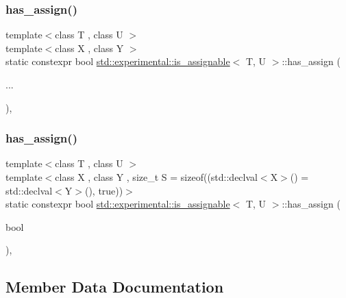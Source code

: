 \subsubsection{\texorpdfstring{has\+\_\+assign()}{has\_assign()}\hspace{0.1cm}{\footnotesize\ttfamily [1/2]}}
{\footnotesize\ttfamily template$<$class T , class U $>$ \\
template$<$class X , class Y $>$ \\
static constexpr bool \mbox{\hyperlink{structstd_1_1experimental_1_1is__assignable}{std\+::experimental\+::is\+\_\+assignable}}$<$ T, U $>$\+::has\+\_\+assign (\begin{DoxyParamCaption}\item[{}]{... }\end{DoxyParamCaption})\hspace{0.3cm}{\ttfamily [inline]}, {\ttfamily [static]}}

\mbox{\label{structstd_1_1experimental_1_1is__assignable_a826902a90f85d2a25cbab409ebe1aff6}} 
\subsubsection{\texorpdfstring{has\+\_\+assign()}{has\_assign()}\hspace{0.1cm}{\footnotesize\ttfamily [2/2]}}
{\footnotesize\ttfamily template$<$class T , class U $>$ \\
template$<$class X , class Y , size\+\_\+t S = sizeof((std\+::declval$<$\+X$>$() = std\+::declval$<$\+Y$>$(), true))$>$ \\
static constexpr bool \mbox{\hyperlink{structstd_1_1experimental_1_1is__assignable}{std\+::experimental\+::is\+\_\+assignable}}$<$ T, U $>$\+::has\+\_\+assign (\begin{DoxyParamCaption}\item[{bool}]{ }\end{DoxyParamCaption})\hspace{0.3cm}{\ttfamily [inline]}, {\ttfamily [static]}}



\subsection{Member Data Documentation}
\mbox{\label{structstd_1_1experimental_1_1is__assignable_a670223830052ed42e41e453386027b45}} 
